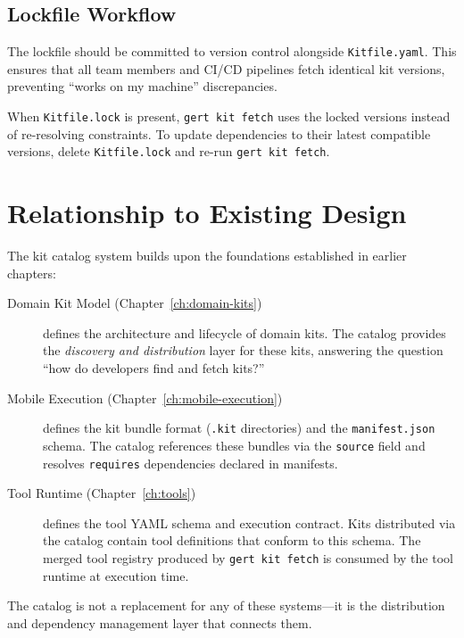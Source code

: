 \subsection{Lockfile Workflow}

The lockfile should be committed to version control alongside \texttt{Kitfile.yaml}. This ensures that all team members and CI/CD pipelines fetch identical kit versions, preventing ``works on my machine'' discrepancies.

When \texttt{Kitfile.lock} is present, \texttt{gert kit fetch} uses the locked versions instead of re-resolving constraints. To update dependencies to their latest compatible versions, delete \texttt{Kitfile.lock} and re-run \texttt{gert kit fetch}.

\section{Relationship to Existing Design}
\label{sec:catalog-relationships}

The kit catalog system builds upon the foundations established in earlier chapters:

\begin{description}
  \item[Domain Kit Model (Chapter~\ref{ch:domain-kits})] defines the architecture and lifecycle of domain kits. The catalog provides the \emph{discovery and distribution} layer for these kits, answering the question ``how do developers find and fetch kits?''

  \item[Mobile Execution (Chapter~\ref{ch:mobile-execution})] defines the kit bundle format (\texttt{.kit} directories) and the \texttt{manifest.json} schema. The catalog references these bundles via the \texttt{source} field and resolves \texttt{requires} dependencies declared in manifests.

  \item[Tool Runtime (Chapter~\ref{ch:tools})] defines the tool YAML schema and execution contract. Kits distributed via the catalog contain tool definitions that conform to this schema. The merged tool registry produced by \texttt{gert kit fetch} is consumed by the tool runtime at execution time.
\end{description}

The catalog is not a replacement for any of these systems---it is the distribution and dependency management layer that connects them.

